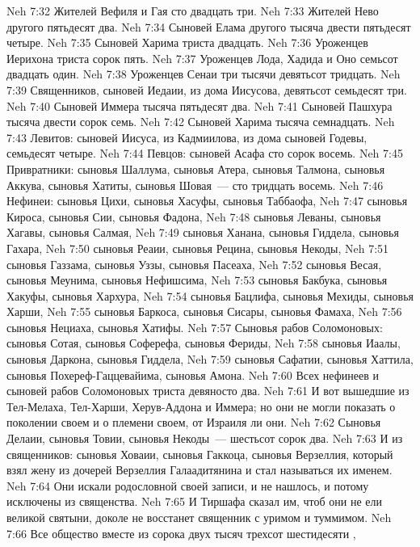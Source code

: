 \vs Neh 7:32 Жителей Вефиля и Гая сто двадцать три.
\vs Neh 7:33 Жителей Нево другого пятьдесят два.
\vs Neh 7:34 Сыновей Елама другого тысяча двести пятьдесят четыре.
\vs Neh 7:35 Сыновей Харима триста двадцать.
\vs Neh 7:36 Уроженцев Иерихона триста сорок пять.
\vs Neh 7:37 Уроженцев Лода, Хадида и Оно семьсот двадцать один.
\vs Neh 7:38 Уроженцев Сенаи три тысячи девятьсот тридцать.
\vs Neh 7:39 Священников, сыновей Иедаии, из дома Иисусова, девятьсот семьдесят три.
\vs Neh 7:40 Сыновей Иммера тысяча пятьдесят два.
\vs Neh 7:41 Сыновей Пашхура тысяча двести сорок семь.
\vs Neh 7:42 Сыновей Харима тысяча семнадцать.
\vs Neh 7:43 Левитов: сыновей Иисуса, из  Кадмиилова, из дома сыновей Годевы, семьдесят четыре.
\vs Neh 7:44 Певцов: сыновей Асафа сто сорок восемь.
\vs Neh 7:45 Привратники: сыновья Шаллума, сыновья Атера, сыновья Талмона, сыновья Аккува, сыновья Хатиты, сыновья Шовая~--- сто тридцать восемь.
\vs Neh 7:46 Нефинеи: сыновья Цихи, сыновья Хасуфы, сыновья Таббаофа,
\vs Neh 7:47 сыновья Кироса, сыновья Сии, сыновья Фадона,
\vs Neh 7:48 сыновья Леваны, сыновья Хагавы, сыновья Салмая,
\vs Neh 7:49 сыновья Ханана, сыновья Гиддела, сыновья Гахара,
\vs Neh 7:50 сыновья Реаии, сыновья Рецина, сыновья Некоды,
\vs Neh 7:51 сыновья Газзама, сыновья Уззы, сыновья Пасеаха,
\vs Neh 7:52 сыновья Весая, сыновья Меунима, сыновья Нефишсима,
\vs Neh 7:53 сыновья Бакбука, сыновья Хакуфы, сыновья Хархура,
\vs Neh 7:54 сыновья Бацлифа, сыновья Мехиды, сыновья Харши,
\vs Neh 7:55 сыновья Баркоса, сыновья Сисары, сыновья Фамаха,
\vs Neh 7:56 сыновья Нециаха, сыновья Хатифы.
\vs Neh 7:57 Сыновья рабов Соломоновых: сыновья Сотая, сыновья Соферефа, сыновья Фериды,
\vs Neh 7:58 сыновья Иаалы, сыновья Даркона, сыновья Гиддела,
\vs Neh 7:59 сыновья Сафатии, сыновья Хаттила, сыновья Похереф-Гаццевайима, сыновья Амона.
\vs Neh 7:60 Всех нефинеев и сыновей рабов Соломоновых триста девяносто два.
\vs Neh 7:61 И вот вышедшие из Тел-Мелаха, Тел-Харши, Херув-Аддона и Иммера; но они не могли показать о поколении своем и о племени своем, от Израиля ли они.
\vs Neh 7:62 Сыновья Делаии, сыновья Товии, сыновья Некоды~--- шестьсот сорок два.
\vs Neh 7:63 И из священников: сыновья Ховаии, сыновья Гаккоца, сыновья Верзеллия, который взял жену из дочерей Верзеллия Галаадитянина и стал называться их именем.
\vs Neh 7:64 Они искали родословной своей записи, и не нашлось, и потому исключены из священства.
\vs Neh 7:65 И Тиршафа сказал им, чтоб они не ели великой святыни, доколе не восстанет священник с уримом и туммимом.
\rsbpar\vs Neh 7:66 Все общество вместе  из сорока двух тысяч трехсот шестидесяти ,
